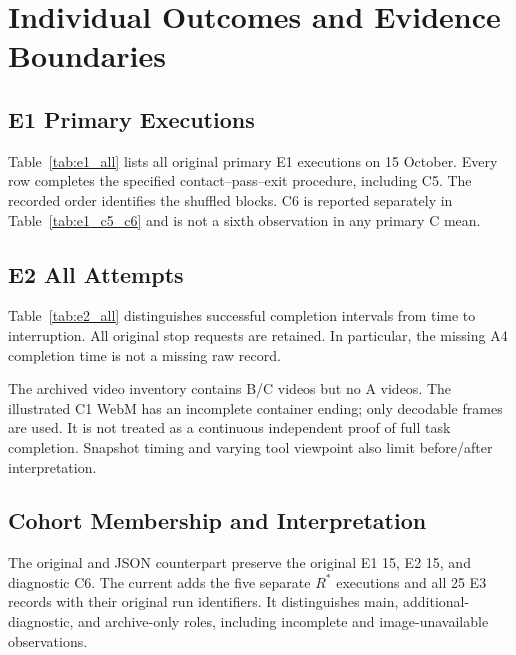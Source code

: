\chapter{Individual Outcomes and Evidence Boundaries}
\label{app:runs}

\section{E1 Primary Executions}
Table~\ref{tab:e1_all} lists all original primary E1 executions on 15 October. Every row completes the specified contact--pass--exit procedure, including C5. The recorded order identifies the shuffled blocks. C6 is reported separately in Table~\ref{tab:e1_c5_c6} and is not a sixth observation in any primary C mean.

\begin{table}[tbp]\centering\small
\caption[Individual primary E1 outcomes]{All 15 primary E1 executions under \texttt{pass\_height\_ref\_v2}. All are procedurally completed. Full run identifiers, original labels, and source paths are preserved in the cohort manifest.}
\label{tab:e1_all}
\end{table}

\section{E2 All Attempts}
Table~\ref{tab:e2_all} distinguishes successful completion intervals from time to interruption. All original stop requests are retained. In particular, the missing A4 completion time is not a missing raw record.

\begin{table}[tbp]\centering\small
\caption[Individual E2 corrected task outcomes]{Individual E2 task outcomes after the A4 field correction. ``Operator completed'' uses the recorded operator interpretation; it is not an automatic E1 evaluation.}
\label{tab:e2_all}
\end{table}

The archived video inventory contains B/C videos but no A videos. The illustrated C1 WebM has an incomplete container ending; only decodable frames are used. It is not treated as a continuous independent proof of full task completion. Snapshot timing and varying tool viewpoint also limit before/after interpretation.

\section{Cohort Membership and Interpretation}
The original  and JSON counterpart preserve the original E1 15, E2 15, and diagnostic C6. The current  adds the five separate \(R^{*}\) executions and all 25 E3 records with their original run identifiers. It distinguishes main, additional-diagnostic, and archive-only roles, including incomplete and image-unavailable observations.

